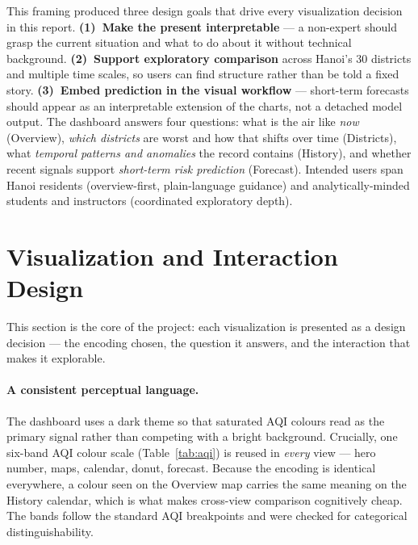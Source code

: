 \documentclass[a4paper]{article}
\begin{document}
This framing produced three design goals that drive every visualization decision in this report.
\textbf{(1)~Make the present interpretable} --- a non-expert should grasp the current situation and what
to do about it without technical background. \textbf{(2)~Support exploratory comparison} across Hanoi's
30 districts and multiple time scales, so users can find structure rather than be told a fixed story.
\textbf{(3)~Embed prediction in the visual workflow} --- short-term forecasts should appear as an
interpretable extension of the charts, not a detached model output. The dashboard answers four questions:
what is the air like \emph{now} (Overview), \emph{which districts} are worst and how that shifts over time
(Districts), what \emph{temporal patterns and anomalies} the record contains (History), and whether recent
signals support \emph{short-term risk prediction} (Forecast). Intended users span Hanoi residents
(overview-first, plain-language guidance) and analytically-minded students and instructors (coordinated
exploratory depth).

\section{Visualization and Interaction Design}
This section is the core of the project: each visualization is presented as a design decision --- the
encoding chosen, the question it answers, and the interaction that makes it explorable.

\paragraph{A consistent perceptual language.}
The dashboard uses a dark theme so that saturated AQI colours read as the primary signal rather than
competing with a bright background. Crucially, one six-band AQI colour scale (Table~\ref{tab:aqi}) is
reused in \emph{every} view --- hero number, maps, calendar, donut, forecast. Because the encoding is
identical everywhere, a colour seen on the Overview map carries the same meaning on the History calendar,
which is what makes cross-view comparison cognitively cheap. The bands follow the standard AQI breakpoints
and were checked for categorical distinguishability.
\end{document}

